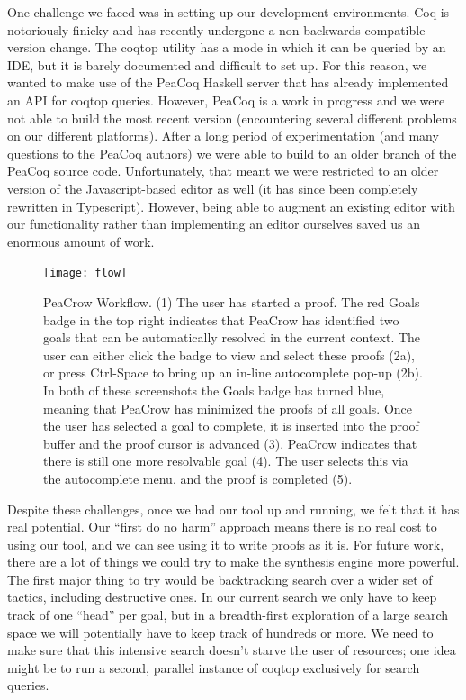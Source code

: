 \documentclass{article}
\begin{document}
One challenge we faced was in setting up our development environments. Coq is notoriously finicky and has recently undergone a non-backwards compatible version change. The coqtop utility has a mode in which it can be queried by an IDE, but it is barely documented and difficult to set up. For this reason, we wanted to make use of the PeaCoq Haskell server that has already implemented an API for coqtop queries. However, PeaCoq is a work in progress and we were not able to build the most recent version (encountering several different problems on our different platforms). After a long period of experimentation (and many questions to the PeaCoq authors) we were able to build to an older branch of the PeaCoq source code. Unfortunately, that meant we were restricted to an older version of the Javascript-based editor as well (it has since been completely rewritten in Typescript). However, being able to augment an existing editor with our functionality rather than implementing an editor ourselves saved us an enormous amount of work.

\begin{figure}
\centering
\texttt{[image: flow]}
\caption{PeaCrow Workflow. (1) The user has started a proof. The red Goals badge in the top right indicates that PeaCrow has identified two goals that can be automatically resolved in the current context. The user can either click the badge to view and select these proofs (2a), or press Ctrl-Space to bring up an in-line autocomplete pop-up (2b). In both of these screenshots the Goals badge has turned blue, meaning that PeaCrow has minimized the proofs of all goals. Once the user has selected a goal to complete, it is inserted into the proof buffer and the proof cursor is advanced (3). PeaCrow indicates that there is still one more resolvable goal (4). The user selects this via the autocomplete menu, and the proof is completed (5).}
\end{figure}


Despite these challenges, once we had our tool up and running, we felt that it has real potential. Our “first do no harm” approach means there is no real cost to using our tool, and we can see using it to write proofs as it is. For future work, there are a lot of things we could try to make the synthesis engine more powerful. The first major thing to try would be backtracking search over a wider set of tactics, including destructive ones. In our current search we only have to keep track of one “head” per goal, but in a breadth-first exploration of a large search space we will potentially have to keep track of hundreds or more. We need to make sure that this intensive search doesn’t starve the user of resources; one idea might be to run a second, parallel instance of coqtop exclusively for search queries.
\end{document}
